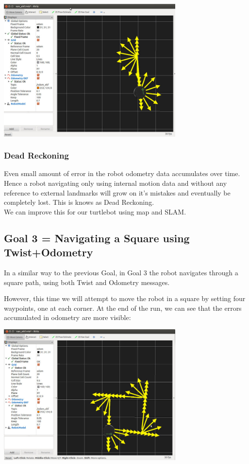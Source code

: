 \documentclass[10pt,a4paper]{article}
\begin{document}
\begin{center}
\includegraphics[width=0.7\textwidth]{odom_out_and_back.jpg}
\end{center}

\subsubsection{Dead Reckoning}
Even small amount of error in the robot odometry data accumulates over time. Hence a robot navigating only using internal motion data and without any reference to external landmarks will grow on it's mistakes and eventually be completely lost. This is knows as Dead Reckoning. \\
We can improve this for our turtlebot using map and SLAM.

\subsection{Goal 3 = Navigating a Square using Twist+Odometry}
In a similar way to the previous Goal, in Goal 3 the robot navigates through a square path, using both Twist and Odometry messages.

However, this time we will attempt to move the robot in a square by setting four waypoints, one at each corner. At the end of the run, we can see that the errors accumulated in odometry are more visible:

\begin{center}
\includegraphics[width=0.7\textwidth]{square_py.jpg}
\end{center}
\end{document}
